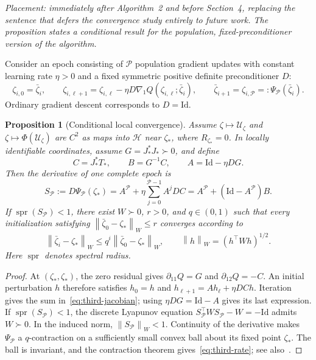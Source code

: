 \documentclass[11pt]{article}
\newcommand{\HH}{\mathcal H}
\newcommand{\PP}{\mathcal P}
\newcommand{\Id}{\mathrm{Id}}
\newcommand{\spr}{\operatorname{spr}}
\newcommand{\norm}[1]{\left\lVert #1\right\rVert}
\newtheorem{proposition}{Proposition}
\begin{document}
\emph{Placement: immediately after Algorithm~2 and before Section~4,
replacing the sentence that defers the convergence study entirely to
future work. The proposition states a conditional result for the
population, fixed-preconditioner version of the algorithm.}

Consider an epoch consisting of $\PP$ population gradient updates with
constant learning rate $\eta>0$ and a fixed symmetric positive definite
preconditioner $D$:
\begin{equation}
 \zeta_{i,0}=\bar\zeta_i,\qquad
 \zeta_{i,\ell+1}=\zeta_{i,\ell}
       -\eta D\nabla_1 Q(\zeta_{i,\ell};\bar\zeta_i),
 \qquad \bar\zeta_{i+1}=\zeta_{i,\PP}=: \Psi_\PP(\bar\zeta_i).
                                                        \label{eq:third-epoch}
\end{equation}
Ordinary gradient descent corresponds to $D=\Id$.

\begin{proposition}[Conditional local convergence]\label{prop:third-local}
Assume $\zeta\mapsto\mathcal U_\zeta$ and
$\zeta\mapsto\Phi(\mathcal U_\zeta)$ are $C^2$ as maps into $\HH$ near
$\zeta_*$, where $R_{\zeta_*}=0$. In locally identifiable coordinates,
assume $G=J_*^*J_*\succ0$, and define
\begin{equation}
 C=J_*^*T_*,\qquad B=G^{-1}C,\qquad A=\Id-\eta DG.
                                                        \label{eq:third-matrices}
\end{equation}
Then the derivative of one complete epoch is
\begin{equation}
 S_\PP:=D\Psi_\PP(\zeta_*)
       =A^\PP+\eta\sum_{j=0}^{\PP-1}A^jDC
       =A^\PP+(\Id-A^\PP)B.                             \label{eq:third-jacobian}
\end{equation}
If $\spr(S_\PP)<1$, there exist $W\succ0$, $r>0$, and $q\in(0,1)$ such
that every initialization satisfying
$\norm{\bar\zeta_0-\zeta_*}_W\leq r$ converges according to
\begin{equation}
 \norm{\bar\zeta_i-\zeta_*}_W
       \leq q^i\norm{\bar\zeta_0-\zeta_*}_W,
 \qquad \norm{h}_W=(h^\top Wh)^{1/2}.                    \label{eq:third-rate}
\end{equation}
Here $\spr$ denotes spectral radius.
\end{proposition}
\begin{proof}
At $(\zeta_*,\zeta_*)$, the zero residual gives
$\partial_{11}Q=G$ and $\partial_{12}Q=-C$. An initial perturbation $h$
therefore satisfies $h_0=h$ and
$h_{\ell+1}=Ah_\ell+\eta DC h$. Iteration gives the sum
in~\eqref{eq:third-jacobian}; using $\eta DG=\Id-A$ gives its last
expression. If $\spr(S_\PP)<1$, the discrete Lyapunov equation
$S_\PP^\top W S_\PP-W=-\Id$ admits $W\succ0$.
In the induced norm, $\norm{S_\PP}_W<1$. Continuity of the derivative
makes $\Psi_\PP$ a $q$-contraction on a sufficiently small convex ball
about its fixed point $\zeta_*$. The ball is invariant, and the
contraction theorem gives~\eqref{eq:third-rate}; see also~\cite{Kelley}.
\end{proof}
\end{document}
